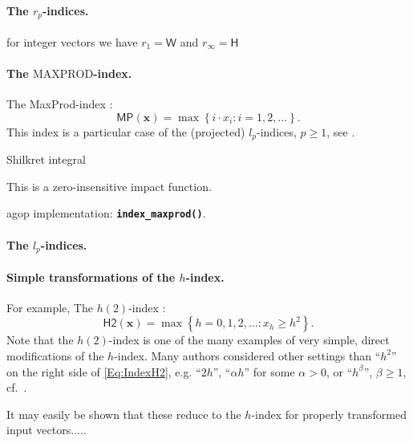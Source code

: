 \documentclass[11pt]{article}\usepackage{graphicx, color}
\newcommand{\hlfunctioncall}[1]{\textcolor[rgb]{0.501960784313725,0,0.329411764705882}{\textbf{#1}}}%
\newcommand{\package}[1]{\textsf{#1}\xspace}
\newcommand{\Rfunc}[1]{\texttt{\hlfunctioncall{#1}}}
\newcommand{\vect}[1]{{\mathbf{#1}}}
\newcommand{\func}[1]{{\mathsf{#1}}}
\theoremstyle{remark}
\theoremstyle{definition}
\begin{document}
\paragraph{The $r_p$-indices.}\cite{GagolewskiGrzegorzewski2009:geometricapproach}
for integer vectors we have $r_1=\func{W}$ and $r_\infty=\func{H}$



\paragraph{The $\mathrm{MAXPROD}$-index.}
The MaxProd-index \cite{Kosmulski2007:maxprod}:
\begin{equation}\label{Eq:IndexMaxProd}
   \func{MP}(\vect{x}) = \max\left\{i\cdot{{x}}_{i}: i=1,2,\ldots\right\}.
\end{equation}
This index is a particular case of the (projected) $l_p$-indices, $p\ge 1$,
see \cite{GagolewskiGrzegorzewski2009:geometricapproach}.

Shilkret integral \cite{Shilkret1971:maxitivemeasure}

This is a zero-insensitive impact function.

\package{agop} implementation: \Rfunc{index\_maxprod()}.




\paragraph{The $l_p$-indices.}\cite{GagolewskiGrzegorzewski2009:geometricapproach}


\paragraph{Simple transformations of the $h$-index.}
For example, The $h(2)$-index \cite{Kosmulski2006:h2}:
\begin{equation}\label{Eq:IndexH2}
\func{H2}(\vect{x}) = \max\left\{h=0,1,2,\ldots: {x}_{h} \ge h^2\right\}. %
\end{equation}
Note that the $h(2)$-index is one of the many examples of very
simple, direct modifications of the $h$-index.
Many authors considered other settings than ``$h^2$'' on the right
side of \eqref{Eq:IndexH2}, e.g. ``$2h$'', ``$\alpha h$'' for some
$\alpha > 0$, or ``$h^\beta$'', $\beta\ge 1$, cf.~\cite{AlonsoETAL2009:hreview}.

It may easily be shown that these reduce to the $h$-index for
properly transformed input vectors.....
\end{document}
